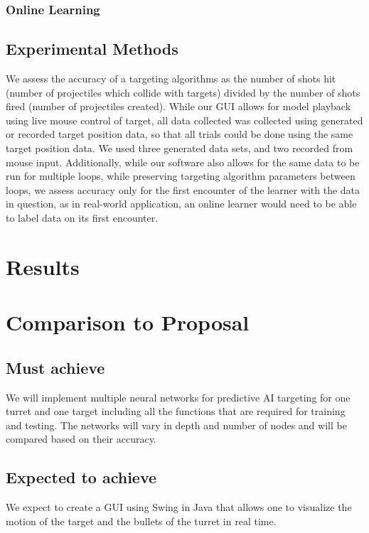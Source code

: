 \documentclass[11pt,letterpaper]{article}
\begin{document}
\subsubsection{Online Learning}


\subsection{Experimental Methods}
We assess the accuracy of a targeting algorithms as the number of shots hit (number of projectiles which collide with targets) divided by the number of shots fired (number of projectiles created). While our GUI allows for model playback using live mouse control of target, all data collected was collected using generated or recorded target position data, so that all trials could be done using the same target position data. We used three generated data sets, and two recorded from mouse input. Additionally, while our software also allows for the same data to be run for multiple loops, while preserving targeting algorithm parameters between loops, we assess accuracy only for the first encounter of the learner with the data in question, as in real-world application, an online learner would need to be able to label data on its first encounter.

\section{Results}


\section{Comparison to Proposal}
\subsection{Must achieve}

We will implement multiple neural networks for predictive AI targeting for one turret and one target including all the functions that are required for training and testing. The networks will vary in depth and number of nodes and will be compared based on their accuracy.

\subsection{Expected to achieve}

We expect to create a GUI using Swing in Java that allows one to visualize the motion of the target and the bullets of the turret in real time.
\end{document}
